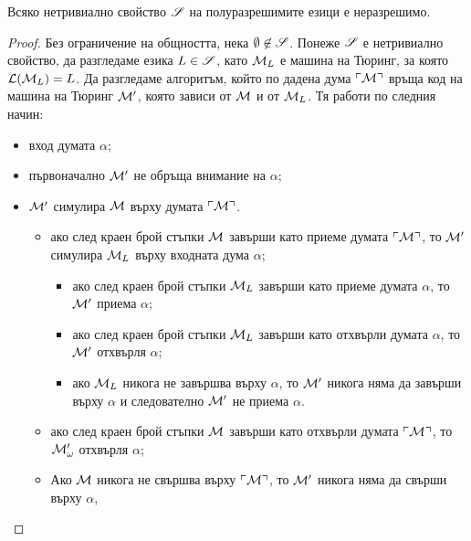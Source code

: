 \begin{framed}
  \begin{thm}[Райс]
    Всяко нетривиално свойство $\mathscr{S}$ на полуразрешимите езици е неразрешимо.
  \end{thm}  
\end{framed}
\begin{proof}
  Без ограничение на общността, нека $\emptyset \not\in \mathscr{S}$.
  Понеже $\mathscr{S}$ е нетривиално свойство, да разгледаме езика $L \in \mathscr{S}$,
  като $\mathcal{M}_L$ е машина на Тюринг, за която $\mathcal{L}(\mathcal{M}_L) = L$.
  Да разгледаме алгоритъм, който по дадена дума $\ulcorner{\mathcal{M}}\urcorner$
  връща код на машина на Тюринг $\mathcal{M}'$, която зависи от $\mathcal{M}$ и от $\mathcal{M}_L$.
  Тя работи по следния начин:
  \begin{itemize}
  \item
    вход думата $\alpha$;
  \item
    първоначално $\mathcal{M}'$ не обръща внимание на $\alpha$;
  \item
    $\mathcal{M}'$ симулира $\mathcal{M}$ върху думата $\ulcorner{\mathcal{M}}\urcorner$.
    \begin{itemize}
    \item
      ако след краен брой стъпки $\mathcal{M}$ завърши като приеме думата $\ulcorner{\mathcal{M}}\urcorner$, то 
      $\mathcal{M}'$ симулира $\mathcal{M}_L$ върху входната дума $\alpha$;
      \begin{itemize}
      \item
        ако след краен брой стъпки $\mathcal{M}_L$ завърши като приеме думата $\alpha$, то 
        $\mathcal{M}'$ приема $\alpha$;
      \item 
        ако след краен брой стъпки $\mathcal{M}_L$ завърши като отхвърли думата $\alpha$, то 
        $\mathcal{M}'$ отхвърля $\alpha$;
      \item
        ако $\mathcal{M}_L$ никога не завършва върху $\alpha$, то 
        $\mathcal{M}'$ никога няма да завърши върху $\alpha$ и следователно $\mathcal{M}'$
        не приема $\alpha$.
      \end{itemize}
    \item
      ако след краен брой стъпки $\mathcal{M}$ завърши като отхвърли думата $\ulcorner{\mathcal{M}}\urcorner$, то 
      $\mathcal{M}'_\omega$ отхвърля $\alpha$;
    \item
      Ако $\mathcal{M}$ никога не свършва върху $\ulcorner{\mathcal{M}}\urcorner$, то $\mathcal{M}'$ никога няма да свърши върху $\alpha$,

\end{itemize}
\end{itemize}
\end{proof}

